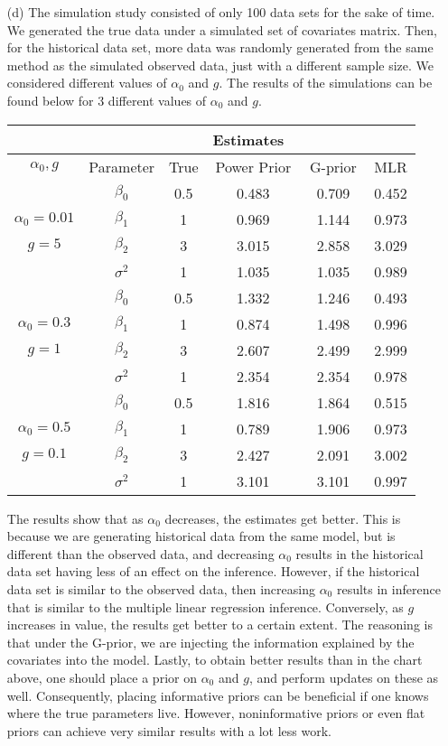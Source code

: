 \documentclass[11pt]{article}
\begin{document}
\begin{itemize}
\item[(d)] The simulation study consisted of only 100 data sets for the sake of time.  We generated the true data under a simulated set of covariates matrix.  Then, for the historical data set, more data was randomly generated from the same method as the simulated observed data, just with a different sample size.  We considered different values of $\alpha_0$ and $g$.  The results of the simulations can be found below for 3 different values of $\alpha_0$ and $g$.
\begin{center}
\begin{tabular}{c|cc||ccc}
\hline \hline
\multicolumn{3}{c||}{} & \multicolumn{3}{r}{Estimates~~~~~~~~~~~~~~~} \\
\hline
$\alpha_0,g$ & Parameter & True & Power Prior & G-prior & MLR \\
\hline
 & $\beta_0$ & 0.5 & 0.483 & 0.709 & 0.452 \\
$\alpha_0 = 0.01$ & $\beta_1$ & 1 & 0.969 & 1.144 & 0.973 \\
$g = 5$ & $\beta_2$ & 3 & 3.015 & 2.858 & 3.029 \\
 & $\sigma^2$ & 1 & 1.035 & 1.035 & 0.989 \\
 \hline
  & $\beta_0$ & 0.5 & 1.332 & 1.246 & 0.493 \\
$\alpha_0 = 0.3$ & $\beta_1$ & 1 & 0.874 & 1.498 & 0.996 \\
$g = 1$ & $\beta_2$ & 3 & 2.607 & 2.499 & 2.999 \\
 & $\sigma^2$ & 1 & 2.354 & 2.354 & 0.978 \\
 \hline
   & $\beta_0$ & 0.5 & 1.816 & 1.864 & 0.515 \\
$\alpha_0 = 0.5$ & $\beta_1$ & 1 & 0.789 & 1.906 & 0.973 \\
$g = 0.1$ & $\beta_2$ & 3 & 2.427 & 2.091 & 3.002 \\
 & $\sigma^2$ & 1 & 3.101 & 3.101 & 0.997 \\
\hline
\end{tabular}
\end{center}
The results show that as $\alpha_0$ decreases, the estimates get better.  This is because we are generating historical data from the same model, but is different than the observed data, and decreasing $\alpha_0$ results in the historical data set having less of an effect on the inference.  However, if the historical data set is similar to the observed data, then increasing $\alpha_0$ results in inference that is similar to the multiple linear regression inference.  Conversely, as $g$ increases in value, the results get better to a certain extent.  The reasoning is that under the G-prior, we are injecting the information explained by the covariates into the model.  Lastly, to obtain better results than in the chart above, one should place a prior on $\alpha_0$ and $g$, and perform updates on these as well.  Consequently, placing informative priors can be beneficial if one knows where the true parameters live.  However, noninformative priors or even flat priors can achieve very similar results with a lot less work.

\end{itemize}
\end{document}
